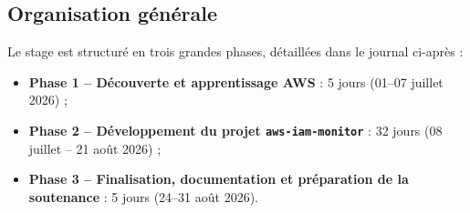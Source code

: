 \documentclass[11pt,a4paper]{article}
\begin{document}
\subsection*{Organisation générale}
Le stage est structuré en trois grandes phases, détaillées dans le journal ci-après :
\begin{itemize}[leftmargin=1.4em]
  \item \textbf{Phase 1 -- Découverte et apprentissage AWS} : 5 jours (01--07 juillet 2026) ;
  \item \textbf{Phase 2 -- Développement du projet \texttt{aws-iam-monitor}} : 32 jours (08 juillet -- 21 août 2026) ;
  \item \textbf{Phase 3 -- Finalisation, documentation et préparation de la soutenance} : 5 jours (24--31 août 2026).
\end{itemize}
\end{document}
